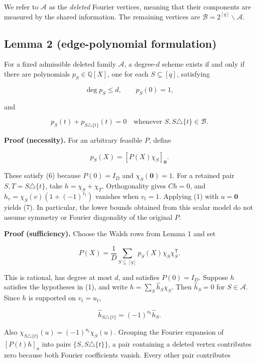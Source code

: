 \documentclass[
  10pt,
]{article}
\begin{document}
We refer to \(\mathcal A\) as the \emph{deleted} Fourier vertices, meaning that their components are measured by the shared information. The remaining vertices are \(\mathcal B=2^{[q]}\mathbin{\backslash}\mathcal A\).

\subsection{Lemma 2 (edge-polynomial formulation)}\label{lemma-2-edge-polynomial-formulation}

For a fixed admissible deleted family \(\mathcal A\), a degree-\(d\) scheme exists if and only if there are polynomials \(p_S\in\mathbb Q[X]\), one for each \(S\subseteq[q]\), satisfying

\[
 \deg p_S\le d,\qquad p_S(0)=1,\tag{6}
\]

and

\[
 p_S(t)+p_{S\triangle\{t\}}(t)=0
 \quad\text{whenever } S,S\triangle\{t\}\in\mathcal B.\tag{7}
\]

\textbf{Proof (necessity).} For an arbitrary feasible \(P\), define

\[
 p_S(X)=[P(X)\chi_S]_{\mathbf0}.
\]

These satisfy (6) because \(P(0)=I_D\) and \(\chi_S(\mathbf0)=1\). For a retained pair \(S,T=S\triangle\{t\}\), take \(h=\chi_S+\chi_T\). Orthogonality gives \(Ch=0\), and \(h_v=\chi_S(v)(1+(-1)^{v_t})\) vanishes when \(v_t=1\). Applying (1) with \(u=\mathbf0\) yields (7). In particular, the lower bounds obtained from this scalar model do not assume symmetry or Fourier diagonality of the original \(P\).

\textbf{Proof (sufficiency).} Choose the Walsh rows from Lemma 1 and set

\[
 P(X)=\frac1D\sum_{S\subseteq[q]}p_S(X)\chi_S\chi_S^{\mathsf T}.\tag{8}
\]

This is rational, has degree at most \(d\), and satisfies \(P(0)=I_D\). Suppose \(h\) satisfies the hypotheses in (1), and write \(h=\sum_S\widehat h_S\chi_S\). Then \(\widehat h_S=0\) for \(S\in\mathcal A\). Since \(h\) is supported on \(v_t=u_t\),

\[
 \widehat h_{S\triangle\{t\}}=(-1)^{u_t}\widehat h_S.
\]

Also \(\chi_{S\triangle\{t\}}(u)=(-1)^{u_t}\chi_S(u)\). Grouping the Fourier expansion of \([P(t)h]_u\) into pairs \(\{S,S\triangle\{t\}\}\), a pair containing a deleted vertex contributes zero because both Fourier coefficients vanish. Every other pair contributes
\end{document}
